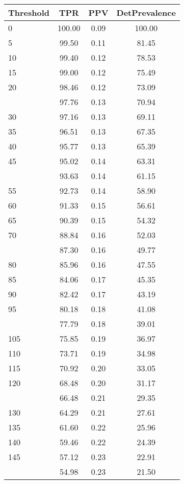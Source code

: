 \begin{table}[ht]
\centering
\begin{tabular}{lccc}
  \toprule
Threshold & TPR & PPV & DetPrevalence \\ 
  \midrule
0 & 100.00 & 0.09 & 100.00 \\ 
  5 & 99.50 & 0.11 & 81.45 \\ 
  10 & 99.40 & 0.12 & 78.53 \\ 
  15 & 99.00 & 0.12 & 75.49 \\ 
  20 & 98.46 & 0.12 & 73.09 \\ 
   \addlinespace
25 & 97.76 & 0.13 & 70.94 \\ 
  30 & 97.16 & 0.13 & 69.11 \\ 
  35 & 96.51 & 0.13 & 67.35 \\ 
  40 & 95.77 & 0.13 & 65.39 \\ 
  45 & 95.02 & 0.14 & 63.31 \\ 
   \addlinespace
50 & 93.63 & 0.14 & 61.15 \\ 
  55 & 92.73 & 0.14 & 58.90 \\ 
  60 & 91.33 & 0.15 & 56.61 \\ 
  65 & 90.39 & 0.15 & 54.32 \\ 
  70 & 88.84 & 0.16 & 52.03 \\ 
   \addlinespace
75 & 87.30 & 0.16 & 49.77 \\ 
  80 & 85.96 & 0.16 & 47.55 \\ 
  85 & 84.06 & 0.17 & 45.35 \\ 
  90 & 82.42 & 0.17 & 43.19 \\ 
  95 & 80.18 & 0.18 & 41.08 \\ 
   \addlinespace
100 & 77.79 & 0.18 & 39.01 \\ 
  105 & 75.85 & 0.19 & 36.97 \\ 
  110 & 73.71 & 0.19 & 34.98 \\ 
  115 & 70.92 & 0.20 & 33.05 \\ 
  120 & 68.48 & 0.20 & 31.17 \\ 
   \addlinespace
125 & 66.48 & 0.21 & 29.35 \\ 
  130 & 64.29 & 0.21 & 27.61 \\ 
  135 & 61.60 & 0.22 & 25.96 \\ 
  140 & 59.46 & 0.22 & 24.39 \\ 
  145 & 57.12 & 0.23 & 22.91 \\ 
   \addlinespace
150 & 54.98 & 0.23 & 21.50 \\ 

\end{tabular}
\end{table}
